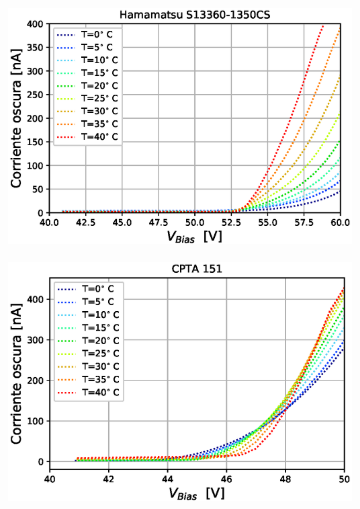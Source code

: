 \begin{figure}[h!]
     \centering
      \caption{Corriente oscura en función del voltaje de polarización para los sensores S13360-1350CS de Hamamatsu (izquierda) y CPTA 151 (derecha) en el rango de temperatura de $0~\mbox{a}~40~^\circ$C.}
     \begin{subfigure}[b]{0.49\textwidth}
         \centering
         \includegraphics[width=1.1\textwidth]{Images/dc_13360.eps}
         \label{fig:dc_13360}
     \end{subfigure}
     \begin{subfigure}[b]{0.49\textwidth}
         \centering
         \includegraphics[width=1.1\textwidth]{Images/dc_CPTA.eps}
         \label{fig:dc_cpta}
     \end{subfigure}
        \label{fig:dc}
\end{figure}
